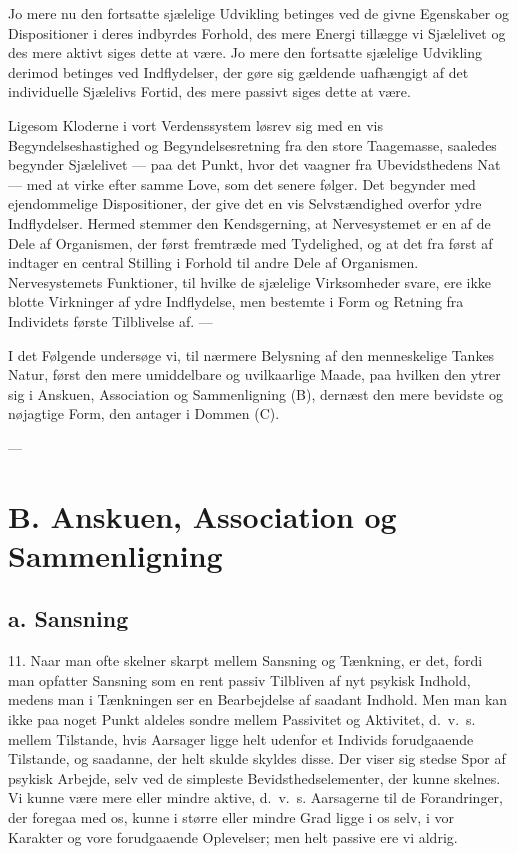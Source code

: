 \documentclass[12pt,a4paper]{book}
\newcommand{\apage}[1]{\marginnote{\footnotesize\textit{[#1]}}}
\begin{document}
Jo mere nu den fortsatte sjælelige Udvikling betinges ved de givne
Egenskaber og Dispositioner i deres indbyrdes Forhold, des mere Energi
tillægge vi Sjælelivet og des mere aktivt siges dette at være. Jo mere
den fortsatte sjælelige Udvikling derimod betinges ved Indflydelser,
der gøre sig gældende uafhængigt af det individuelle Sjælelivs Fortid,
des mere passivt siges dette at være.

Ligesom Kloderne i vort Verdenssystem løsrev sig med en vis
Begyndelseshastighed og Begyndelsesretning fra den store Taagemasse,
saaledes begynder Sjælelivet --- paa det Punkt, hvor det vaagner fra
Ubevidsthedens Nat --- med at virke efter samme Love, som det senere
følger. Det begynder med ejendommelige Dispositioner, der give det en
vis Selvstændighed overfor ydre Indflydelser. Hermed stemmer den
Kendsgerning, at Nervesystemet er en af de Dele af Organismen, der
først fremtræde med Tydelighed, og at det fra først af indtager en
central Stilling i Forhold til andre Dele af Organismen. Nervesystemets
Funktioner, til hvilke de sjælelige Virksomheder svare, ere ikke blotte
Virkninger \apage{37} af ydre Indflydelse, men bestemte i Form og Retning fra
Individets første Tilblivelse af. ---

I det Følgende undersøge vi, til nærmere Belysning af den menneskelige
Tankes Natur, først den mere umiddelbare og uvilkaarlige Maade, paa
hvilken den ytrer sig i Anskuen, Association og Sammenligning (B),
dernæst den mere bevidste og nøjagtige Form, den antager i Dommen (C).

\begin{center}---\end{center}

\section*{B. Anskuen, Association og Sammenligning}
\label{sec:anskuen}

\subsection*{a. Sansning}
\label{ssec:sansning}

11. Naar man ofte skelner skarpt mellem Sansning og Tænkning, er det,
fordi man opfatter Sansning som en rent passiv Tilbliven af nyt psykisk
Indhold, medens man i Tænkningen ser en Bearbejdelse af saadant
Indhold. Men man kan ikke paa noget Punkt aldeles sondre mellem
Passivitet og Aktivitet, d.\ v.\ s. mellem Tilstande, hvis Aarsager
ligge helt udenfor et Individs forudgaaende Tilstande, og saadanne, der
helt skulde skyldes disse. Der viser sig stedse Spor af psykisk
Arbejde, selv ved de simpleste Bevidsthedselementer, der kunne skelnes.
Vi kunne være mere eller mindre aktive, d.\ v.\ s. Aarsagerne til de
Forandringer, der foregaa med os, kunne i større eller mindre Grad
ligge i os selv, i vor Karakter og vore forudgaaende Oplevelser; men
helt passive ere vi aldrig.
\end{document}
